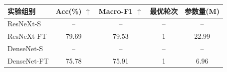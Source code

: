 \begin{tabular}{lcccc}
\toprule
实验组别 & Acc(\%) $\uparrow$ & Macro-F1 $\uparrow$ & 最优轮次 & 参数量(M) \\
\midrule
ResNeXt-S & -- & -- & -- & -- \\
ResNeXt-FT & 79.69 & 79.53 & 1 & 22.99 \\
DenseNet-S & -- & -- & -- & -- \\
DenseNet-FT & 75.78 & 75.91 & 1 & 6.96 \\
\bottomrule
\end{tabular}
